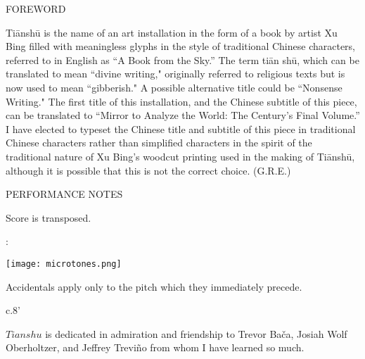 \documentclass[10pt]{article}
\begin{document}
\begin{center}
\huge FOREWORD
\end{center}

\begin{center}
Ti\=ansh\=u is the name of an art installation in the form of a book by artist Xu Bing filled with meaningless glyphs in the style of traditional Chinese characters, referred to in English as ``A Book from the Sky.'' The term ti\=an sh\=u, which can be translated to mean ``divine writing," originally referred to religious texts but is now used to mean ``gibberish." A possible alternative title could be ``Nonsense Writing." The first title of this installation, and the Chinese subtitle of this piece, can be translated to ``Mirror to Analyze the World: The Century's Final Volume.'' I have elected to typeset the Chinese title and subtitle of this piece in traditional Chinese characters rather than simplified characters in the spirit of the traditional nature of Xu Bing's woodcut printing used in the making of Ti\=ansh\=u, although it is possible that this is not the correct choice.
\rightskip\leftskip
\phantom{text} \hfill (G.R.E.)
  \end{center}
  
\vspace*{1\baselineskip}

\begin{center}
\huge PERFORMANCE NOTES
\end{center}

\begin{center}
Score is transposed.
\end{center}

\begin{center}
:
\end{center}

\begin{center}
\texttt{[image: microtones.png]}
\end{center}

\begin{center}
Accidentals apply only to the pitch which they immediately precede.
\end{center}

\vspace*{5\baselineskip}

\begin{center}
c.8'
\end{center}

\vspace*{5\baselineskip}

\begin{center}
$Tianshu$ is dedicated in admiration and friendship to Trevor Ba\v{c}a, Josiah Wolf Oberholtzer, and Jeffrey Trevi\~{n}o from whom I have learned so much.
\rightskip\leftskip
\end{center}
\end{document}
